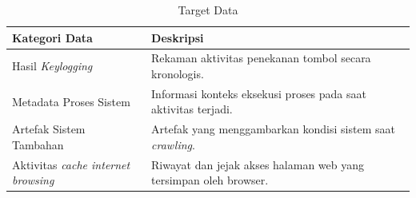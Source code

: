 \begin{table}[h]
\captionsetup{justification=raggedright,singlelinecheck=false}
\caption{Target Data}
\label{tbl:target-data}

\raggedright
\begin{tabular}{|p{5cm}|p{7.9cm}|}
\hline
\textbf{Kategori Data} & \textbf{Deskripsi} \\
\hline

Hasil \textit{Keylogging} &
Rekaman aktivitas penekanan tombol secara kronologis. \\
\hline

Metadata Proses Sistem &
Informasi konteks eksekusi proses pada saat aktivitas terjadi. \\
\hline

Artefak Sistem Tambahan &
Artefak yang menggambarkan kondisi sistem saat \textit{crawling}. \\
\hline

Aktivitas \textit{cache internet browsing} &
Riwayat dan jejak akses halaman web yang tersimpan oleh browser. \\
\hline
\end{tabular}
\end{table}
